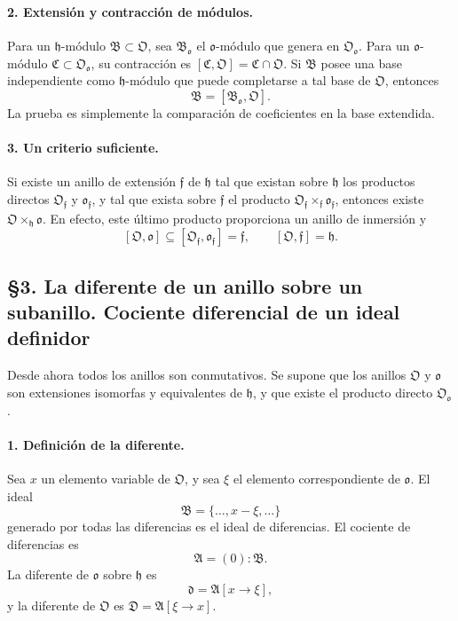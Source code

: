 \paragraph{2. Extensión y contracción de módulos.}
Para un $\mathfrak h$-módulo $\mathfrak B\subset\mathfrak O$, sea $\mathfrak B_{\mathfrak o}$ el $\mathfrak o$-módulo que genera en $\mathfrak O_{\mathfrak o}$. Para un $\mathfrak o$-módulo $\mathfrak C\subset\mathfrak O_{\mathfrak o}$, su contracción es $[\mathfrak C,\mathfrak O]=\mathfrak C\cap\mathfrak O$. Si $\mathfrak B$ posee una base independiente como $\mathfrak h$-módulo que puede completarse a tal base de $\mathfrak O$, entonces
\[
        \mathfrak B=[\mathfrak B_{\mathfrak o},\mathfrak O].
\]
La prueba es simplemente la comparación de coeficientes en la base extendida.

\paragraph{3. Un criterio suficiente.}
Si existe un anillo de extensión $\mathfrak f$ de $\mathfrak h$ tal que existan sobre $\mathfrak h$ los productos directos $\mathfrak O_{\mathfrak f}$ y $\mathfrak o_{\mathfrak f}$, y tal que exista sobre $\mathfrak f$ el producto $\mathfrak O_{\mathfrak f}\times_{\mathfrak f}\mathfrak o_{\mathfrak f}$, entonces existe $\mathfrak O\times_{\mathfrak h}\mathfrak o$. En efecto, este último producto proporciona un anillo de inmersión y
\[
        [\mathfrak O,\mathfrak o]\subseteq [\mathfrak O_{\mathfrak f},\mathfrak o_{\mathfrak f}]=\mathfrak f,
        \qquad [\mathfrak O,\mathfrak f]=\mathfrak h.
\]

\subsection*{§3. La diferente de un anillo sobre un subanillo. Cociente diferencial de un ideal definidor}

Desde ahora todos los anillos son conmutativos. Se supone que los anillos $\mathfrak O$ y $\mathfrak o$ son extensiones isomorfas y equivalentes de $\mathfrak h$, y que existe el producto directo $\mathfrak O_{\mathfrak o}$.

\paragraph{1. Definición de la diferente.}
Sea $x$ un elemento variable de $\mathfrak O$, y sea $\xi$ el elemento correspondiente de $\mathfrak o$. El ideal
\[
        \mathfrak B=\{\ldots,x-\xi,\ldots\}
\]
generado por todas las diferencias es el ideal de diferencias. El cociente de diferencias es
\[
        \mathfrak A=(0):\mathfrak B.
\]
La diferente de $\mathfrak o$ sobre $\mathfrak h$ es
\[
        \mathfrak d=\mathfrak A[x\to\xi],
\]
y la diferente de $\mathfrak O$ es $\mathfrak D=\mathfrak A[\xi\to x]$.

